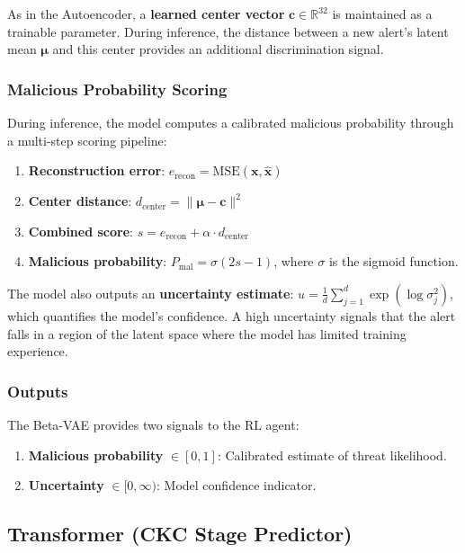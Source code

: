 As in the Autoencoder, a \textbf{learned center vector} $\mathbf{c} \in \mathbb{R}^{32}$ is maintained as a trainable parameter. During inference, the distance between a new alert's latent mean $\boldsymbol{\mu}$ and this center provides an additional discrimination signal.

\subsubsection{Malicious Probability Scoring}

During inference, the model computes a calibrated malicious probability through a multi-step scoring pipeline:

\begin{enumerate}
    \item \textbf{Reconstruction error}: $e_{\text{recon}} = \text{MSE}(\mathbf{x}, \hat{\mathbf{x}})$
    \item \textbf{Center distance}: $d_{\text{center}} = \| \boldsymbol{\mu} - \mathbf{c} \|^2$
    \item \textbf{Combined score}: $s = e_{\text{recon}} + \alpha \cdot d_{\text{center}}$
    \item \textbf{Malicious probability}: $P_{\text{mal}} = \sigma(2s - 1)$, where $\sigma$ is the sigmoid function.
\end{enumerate}

The model also outputs an \textbf{uncertainty estimate}: $u = \frac{1}{d} \sum_{j=1}^{d} \exp(\log \sigma^2_j)$, which quantifies the model's confidence. A high uncertainty signals that the alert falls in a region of the latent space where the model has limited training experience.

\subsubsection{Outputs}

The Beta-VAE provides two signals to the RL agent:
\begin{enumerate}
    \item \textbf{Malicious probability} $\in [0, 1]$: Calibrated estimate of threat likelihood.
    \item \textbf{Uncertainty} $\in [0, \infty)$: Model confidence indicator.
\end{enumerate}


\subsection{Transformer (CKC Stage Predictor)}
\label{subsec:transformer}

